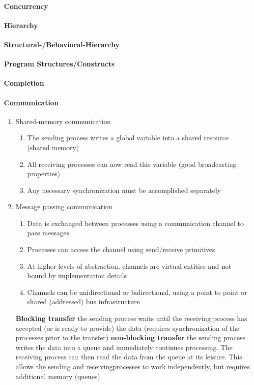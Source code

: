 \documentclass[english]{latex4ei/latex4ei_sheet}
\begin{document}
\paragraph{Concurrency}

\paragraph{Hierarchy}

\paragraph{Structural-/Behavioral-Hierarchy}

\paragraph{Program Structures/Constructs}

\paragraph{Completion}

\paragraph{Communication}
\begin{enumerate}
  \item Shared-memory communication
    \begin{enumerate}
      \item The sending process writes a global variable into a shared resource (shared memory)
      \item All receiving processes can now read this variable (good broadcasting properties)
      \item Any necessary synchronization must be accomplished separately
    \end{enumerate}
  \item Message passing communication
    \begin{enumerate}
    	\item Data is exchanged between processes using a communication channel to pass messages
	\item Processes can access the channel using send/receive primitives
	\item At higher levels of abstraction, channels are virtual entities and not bound by implementation details
	\item  Channels can be unidirectional or bidirectional, using a point to point or shared (addressed) bus infrastructure
    \end{enumerate}

    \textbf{Blocking transfer} the sending process waits until the receiving process has accepted (or is ready to provide) the data (requires synchronization of the processes prior to the transfer)
    \textbf{non-blocking transfer} the sending process writes the data into a queue and immediately continues processing. The receiving process can then read the data from the queue at its leisure. This allows the sending and receivingprocesses to work independently, but requires additional memory (queues).
\end{enumerate}
\end{document}
